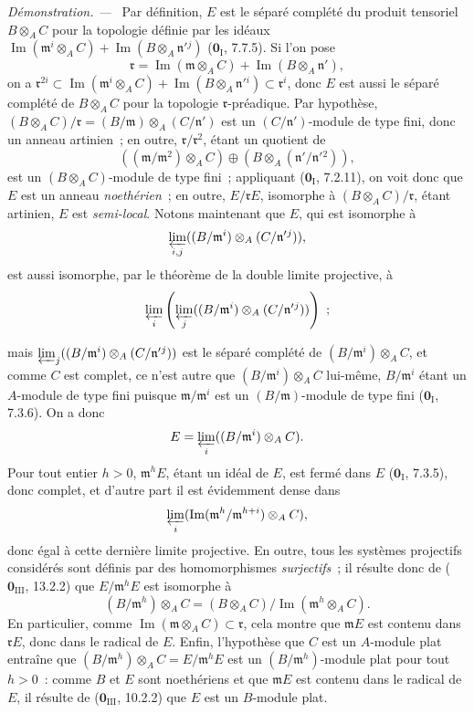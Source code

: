 \documentclass[10pt,oneside]{book}
\newcommand{\oldpage}[2][]{%
  \setcounter{footnote}{0}%
  \marginpar{\scriptsize\textbf{#1}~|~#2}\ignorespaces}
\newenvironment{proof}{%
  \par\medskip\noindent\textit{Démonstration. ---\ }}{\par}
\begin{document}
\begin{proof}
Par définition, $E$ est le séparé complété du produit tensoriel $B\otimes_A C$
pour la topologie définie par les idéaux
$\operatorname{Im}(\mathfrak m^i\otimes_A C)+
\operatorname{Im}(B\otimes_A\mathfrak n'{}^j)$
($\mathbf 0_{\mathrm I}$, 7.7.5). Si l'on pose
\[
  \mathfrak r=\operatorname{Im}(\mathfrak m\otimes_A C)+
  \operatorname{Im}(B\otimes_A\mathfrak n'),
\]
on a
$\mathfrak r^{2i}\subset
\operatorname{Im}(\mathfrak m^i\otimes_A C)+
\operatorname{Im}(B\otimes_A\mathfrak n'{}^i)\subset\mathfrak r^i$, donc $E$
est aussi le séparé complété de $B\otimes_A C$ pour la topologie
$\mathfrak r$-préadique. Par hypothèse,
$(B\otimes_A C)/\mathfrak r=(B/\mathfrak m)\otimes_A(C/\mathfrak n')$ est un
$(C/\mathfrak n')$-module de type fini, donc un anneau artinien~; en outre,
$\mathfrak r/\mathfrak r^2$, étant un quotient de
\[
  ((\mathfrak m/\mathfrak m^2)\otimes_A C)
  \oplus(B\otimes_A(\mathfrak n'/\mathfrak n'{}^2)),
\]
est un $(B\otimes_A C)$-module de type fini~; appliquant
($\mathbf 0_{\mathrm I}$, 7.2.11), on voit donc que $E$ est un anneau
\emph{noethérien}~; en outre, $E/\mathfrak rE$, isomorphe à
$(B\otimes_A C)/\mathfrak r$, étant artinien, $E$ est \emph{semi-local}.
Notons maintenant que $E$, qui est isomorphe à
\[
  \varprojlim_{i,j}((B/\mathfrak m^i)\otimes_A(C/\mathfrak n'{}^j)),
\]
est aussi isomorphe, par le théorème de la double limite projective, à
\[
  \varprojlim_i\left(\varprojlim_j
  ((B/\mathfrak m^i)\otimes_A(C/\mathfrak n'{}^j))\right)~;
\]

\oldpage[0\textsubscript{IV-1}]{106}

mais $\varprojlim_j((B/\mathfrak m^i)\otimes_A(C/\mathfrak n'{}^j))$ est le
séparé complété de $(B/\mathfrak m^i)\otimes_A C$, et comme $C$ est complet,
ce n'est autre que $(B/\mathfrak m^i)\otimes_A C$ lui-même,
$B/\mathfrak m^i$ étant un $A$-module de type fini puisque
$\mathfrak m/\mathfrak m^i$ est un $(B/\mathfrak m)$-module de type fini
($\mathbf 0_{\mathrm I}$, 7.3.6). On a donc
\[
  E=\varprojlim_i((B/\mathfrak m^i)\otimes_A C).
\]
Pour tout entier $h>0$, $\mathfrak m^hE$, étant un idéal de $E$, est fermé
dans $E$ ($\mathbf 0_{\mathrm I}$, 7.3.5), donc complet, et d'autre part il est
évidemment dense dans
\[
  \varprojlim_i
  (\operatorname{Im}(\mathfrak m^h/\mathfrak m^{h+i})\otimes_A C),
\]
donc égal à cette dernière limite projective. En outre, tous les systèmes
projectifs considérés sont définis par des homomorphismes \emph{surjectifs}~;
il résulte donc de ($\mathbf 0_{\mathrm{III}}$, 13.2.2) que
$E/\mathfrak m^hE$ est isomorphe à
\[
  (B/\mathfrak m^h)\otimes_A C
  =(B\otimes_A C)/\operatorname{Im}(\mathfrak m^h\otimes_A C).
\]
En particulier, comme
$\operatorname{Im}(\mathfrak m\otimes_A C)\subset\mathfrak r$, cela montre
que $\mathfrak mE$ est contenu dans $\mathfrak rE$, donc dans le radical de
$E$. Enfin, l'hypothèse que $C$ est un $A$-module plat entraîne que
$(B/\mathfrak m^h)\otimes_A C=E/\mathfrak m^hE$ est un
$(B/\mathfrak m^h)$-module plat pour tout $h>0$~: comme $B$ et $E$ sont
noethériens et que $\mathfrak mE$ est contenu dans le radical de $E$, il
résulte de ($\mathbf 0_{\mathrm{III}}$, 10.2.2) que $E$ est un $B$-module
plat.
\end{proof}
\end{document}

